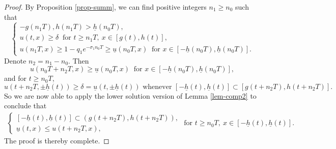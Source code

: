 \documentclass[11pt]{amsart}
\numberwithin{equation}{section}
\begin{document}
\begin{proof}
By Proposition \ref{prop-summ}, we can find positive integers $n_1\geq  n_0$ such that 
\begin{equation*}\begin{cases}
-g(n_1T), h(n_1T)>\underline{h}( n_0T),\\
  u(t,x)\geq \delta ~\text{ for }t\geq n_1T,\  x\in[g(t),h(t)],\\
  u(n_1T,x)\geq 1-q_1e^{-\sigma_1 n_0T}\geq \underline{u}( n_0T,x) ~\text{ for }x\in[-\underline{h}( n_0T),\underline{h}( n_0T)].
  \end{cases}
\end{equation*} 
Denote $n_2=n_1-n_0$. Then
\begin{equation*}
u( n_0T+n_2T,x)\geq \underline{u}( n_0T,x) ~\text{ for }x\in[-\underline{h}( n_0T),\underline{h}( n_0T)],
\end{equation*} 
and for $t\geq  n_0T$, 
 \begin{equation*}
  u(t+n_2T,\pm \underline{h}(t))\geq \delta=\underline{u}(t,\pm \underline{h}(t)) \text{ whenever } [-\underline{h}(t),\underline{h}(t)]\subset [g(t+n_2T),h(t+n_2T)].
 \end{equation*}  
So we are now able to apply the lower solution version of Lemma  \ref{lem-comp2} to conclude that 
\begin{eqnarray*}\begin{cases}
  [-\underline{h}(t),\underline{h}(t)]\subset (g(t+n_2T),h(t+n_2T)),\\ \underline{u}(t,x)\leq u(t+n_2T,x),
  \end{cases}  \text{ for }t\geq  n_0T,\ x\in [-\underline{h}(t),\underline{h}(t)].
\end{eqnarray*}
The proof is thereby complete. 
\end{proof}
\end{document}
